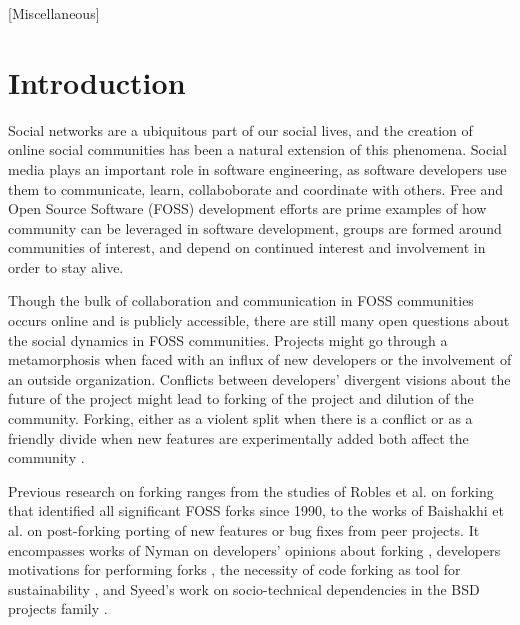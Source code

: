 \documentclass{acm_proc_article-sp}
\begin{document}
[Miscellaneous]



\section{Introduction}
\label{introduction}
Social networks are a ubiquitous part of our social lives, and the creation of online social communities has been a natural extension of this phenomena. Social media plays an important role in software engineering, as software developers use them to communicate, learn, collaboborate and coordinate with others.\cite{Storey} Free and Open Source Software (FOSS) development efforts are prime examples of how community can be leveraged in software development, groups are formed around communities of interest, and depend on continued interest and involvement in order to stay alive.\cite{NymanCodeForking}

Though the bulk of collaboration and communication in FOSS communities occurs online and is publicly accessible, there are still many open questions about the social dynamics in FOSS communities. Projects might go through a metamorphosis when faced with an influx of new developers or the involvement of an outside organization. Conflicts between developers' divergent visions about the future of the project might lead to forking of the project and dilution of the community. Forking, either as a violent split when there is a conflict or as a friendly divide when new features are experimentally added both affect the community \cite{Bezrukova}.

Previous research on forking ranges from the studies of Robles et al. \cite{Robles} on forking that identified all significant FOSS forks since 1990, to the works of Baishakhi et al. \cite{Baishakhi} on post-forking porting of new features or bug fixes from peer projects. It encompasses works of Nyman on developers' opinions about forking \cite{NymanHackersForking}, developers motivations for performing forks \cite{NymanToForkOrNotToFork}, the necessity of code forking as tool for sustainability \cite{NymanForkingSustainability}, and Syeed's work on socio-technical dependencies in the BSD projects family \cite{Syeed}.
\end{document}
